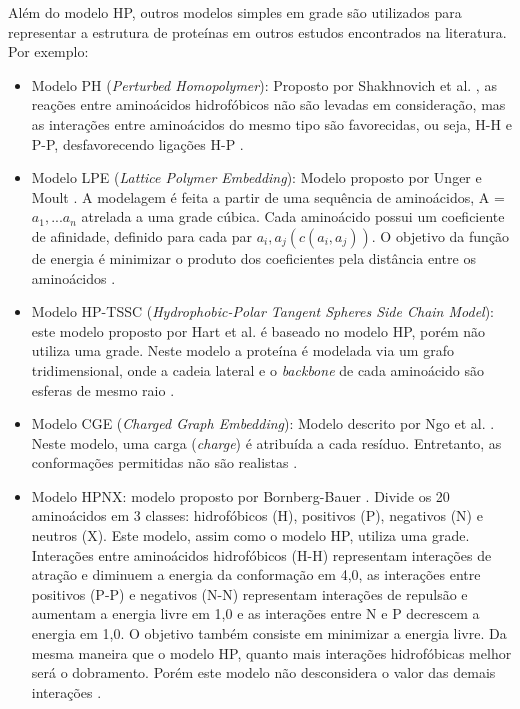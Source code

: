 Além do modelo HP, outros modelos simples em grade são utilizados para representar a estrutura de proteínas em outros estudos encontrados na literatura. Por exemplo:

\begin{itemize}
	\item Modelo PH (\textit{Perturbed Homopolymer}): Proposto por Shakhnovich et al. \cite{shakhnovich1993engineering}, as reações entre aminoácidos hidrofóbicos não são levadas em consideração, mas as interações entre aminoácidos do mesmo tipo são favorecidas, ou seja, H-H e P-P, desfavorecendo ligações H-P \cite{benitez2015algoritmo}.
	\item Modelo LPE (\textit{Lattice Polymer Embedding}): Modelo proposto por Unger e Moult \cite{unger1993finding}. A modelagem é feita a partir de uma sequência de aminoácidos, A = $a_1,...a_n$ atrelada a uma grade cúbica. Cada aminoácido possui um coeficiente de afinidade, definido para cada par $a_i,a_j (c(a_i,a_j))$. O objetivo da função de energia é minimizar o produto dos coeficientes pela distância entre os aminoácidos \cite{benitez2015algoritmo}.
	\item Modelo HP-TSSC (\textit{Hydrophobic-Polar Tangent Spheres Side Chain Model}): este modelo
	proposto por Hart et al. \cite{hart1997lattice} é baseado no modelo HP, porém não
	utiliza uma grade. Neste modelo a proteína é modelada via um grafo tridimensional, onde a cadeia lateral e o \textit{backbone}
	de cada aminoácido são esferas de mesmo raio \cite{benitez2015algoritmo}.
	\item Modelo CGE (\textit{Charged Graph Embedding}): Modelo descrito por Ngo et al. \cite{ngo1994protein}. Neste modelo, uma carga (\textit{charge}) é atribuída a cada
	resíduo. Entretanto, as conformações permitidas não são realistas \cite{benitez2015algoritmo}. 
	\item Modelo HPNX: modelo proposto por Bornberg-Bauer \cite{bornberg1997chain}. Divide
	os 20 aminoácidos em 3 classes: hidrofóbicos (H), positivos (P), negativos
	(N) e neutros (X). Este modelo, assim como o modelo HP, utiliza uma grade. Interações entre aminoácidos hidrofóbicos (H-H) representam
	interações de atração e diminuem a energia da conformação em 4,0,
	as interações entre positivos (P-P) e negativos (N-N) representam interações de repulsão e aumentam a energia livre em 1,0 e as interações entre N e P decrescem a energia em 1,0. O objetivo também consiste em minimizar a energia livre. Da mesma maneira que o modelo HP, quanto mais interações hidrofóbicas melhor será o dobramento. Porém este modelo não desconsidera o valor das demais interações \cite{benitez2015algoritmo}.

\end{itemize}
